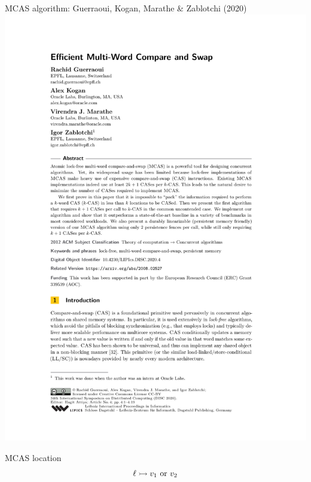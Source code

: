 \begin{frame}{MCAS algorithm: Guerraoui, Kogan, Marathe \& Zablotchi (2020)}
\centering
\includegraphics[scale=0.5]{images/guerraoui_kogan_marathe_zablotchi_2020.pdf}
\end{frame}

\begin{frame}{MCAS location}
\centering
\Large
\[
  \ell \rightarrowtail v_1\ \text{or}\ v_2
\]
\vfill
{}
\end{frame}

